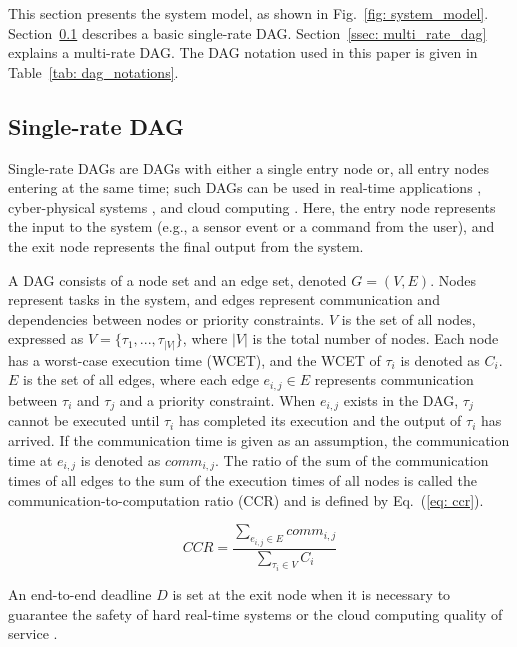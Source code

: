 This section presents the system model, as shown in Fig.~\ref{fig: system_model}.
Section~\ref{ssec: single_rate_dag} describes a basic single-rate DAG.
Section~\ref{ssec: multi_rate_dag} explains a multi-rate DAG.
The DAG notation used in this paper is given in Table~\ref{tab: dag_notations}.


\subsection{Single-rate DAG}
\label{ssec: single_rate_dag}

Single-rate DAGs are DAGs with either a single entry node or, all entry nodes entering at the same time; such DAGs can be used in real-time applications \cite{zhao2020dag}, cyber-physical systems \cite{senapati2021hmds}, and cloud computing \cite{kaur2020deep}.
Here, the entry node represents the input to the system (e.g., a sensor event or a command from the user), and the exit node represents the final output from the system.

A DAG consists of a node set and an edge set, denoted $G = (V, E)$.
Nodes represent tasks in the system, and edges represent communication and dependencies between nodes or priority constraints.
$V$ is the set of all nodes, expressed as $V = \{\tau_1, ..., \tau_{|V|}\}$, where $|V|$ is the total number of nodes.
Each node has a worst-case execution time (WCET), and the WCET of $\tau_i$ is denoted as $C_i$.
$E$ is the set of all edges, where each edge $e_{i,j} \in E$ represents communication between $\tau_i$ and $\tau_j$ and a priority constraint.
When $e_{i,j}$ exists in the DAG, $\tau_j$ cannot be executed until $\tau_i$ has completed its execution and the output of $\tau_i$ has arrived.
If the communication time is given as an assumption, the communication time at $e_{i,j}$ is denoted as $comm_{i, j}$.
The ratio of the sum of the communication times of all edges to the sum of the execution times of all nodes is called the communication-to-computation ratio (CCR) and is defined by Eq.~(\ref{eq: ccr}).

\begin{equation}
    \label{eq: ccr}
    CCR = \frac{\sum\limits_{e_{i,j} \in E}comm_{i, j}}{\sum\limits_{\tau_i \in V}C_i}
\end{equation}

An end-to-end deadline $D$ is set at the exit node when it is necessary to guarantee the safety of hard real-time systems \cite{yano2021work} or the cloud computing quality of service \cite{zhang2020efficient}.


